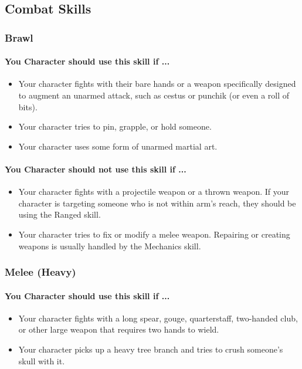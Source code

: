 \subsection{Combat Skills}
\begin{multicols}{2}
\subsubsection{Brawl}\label{skill:brawl}
\paragraph{You Character should use this skill if ...}
\begin{itemize}
    \item Your character fights with their bare hands or a weapon specifically
        designed to augment an unarmed attack, such as cestus or punchik (or even
        a roll of bits).
    \item Your character tries to pin, grapple, or hold someone.
    \item Your character uses some form of unarmed martial art.
\end{itemize}
\paragraph{You Character should not use this skill if ...}
\begin{itemize}
    \item Your character fights with a projectile weapon or a thrown weapon. If
        your character is targeting someone who is not within arm's reach, they
        should be using the Ranged skill.
    \item Your character tries to fix or modify a melee weapon. Repairing or
        creating weapons is usually handled by the Mechanics skill.
\end{itemize}

\subsubsection{Melee (Heavy)}\label{skill:melee_heavy}
\paragraph{You Character should use this skill if ...}
\begin{itemize}
    \item Your character fights with a long spear, gouge, quarterstaff, two-handed
        club, or other large weapon that requires two hands to wield.
    \item Your character picks up a heavy tree branch and tries to crush someone's
        skull with it.
\end{itemize}

\end{multicols}
